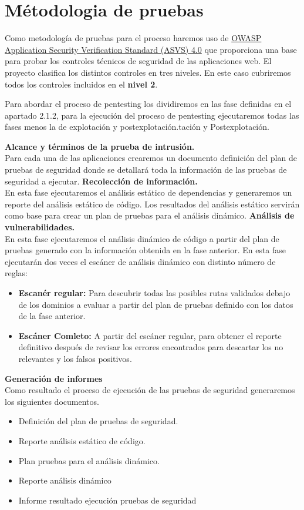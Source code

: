 
\section{Métodologia de pruebas} 

Como metodología de pruebas para el proceso haremos uso 
de \href{https://owasp.org/www-pdf-archive/OWASP_Application_Security_Verification_Standard_4.0-en.pdf}{OWASP Application Security Verification Standard (ASVS) 4.0} 
que proporciona una base para probar los controles técnicos de seguridad de las aplicaciones web. El proyecto clasifica
 los distintos controles en tres niveles. En este caso cubriremos todos los controles incluidos en el \textbf{nivel 2}.

 Para abordar el proceso de pentesting los dividiremos en las fase definidas en el 
 apartado 2.1.2, para la ejecución del proceso de pentesting ejecutaremos todas las fases menos la 
 de explotación y postexplotación.tación y Postexplotación.

\textbf{Alcance y términos de la prueba de intrusión.}\\
 Para cada una de las aplicaciones crearemos un documento definición del plan de pruebas de seguridad donde se
detallará toda la información de las pruebas de seguridad a ejecutar.
\textbf{Recolección de información.}\\
En esta fase ejecutaremos el análisis estático de dependencias y generaremos un reporte del análisis estático de código. Los resultados del 
análisis estático servirán como base para crear un plan de pruebas para el análisis dinámico.
\textbf{Análisis de vulnerabilidades.}\\
En esta fase ejecutaremos el análisis dinámico de código a partir del plan de pruebas generado con la información obtenida en la fase anterior.
En esta fase ejecutarán dos veces el escáner de análisis dinámico con distinto número de reglas:
\begin{itemize}
    \item \textbf{Escanér regular:} Para descubrir todas las posibles rutas validados debajo de los dominios 
    a evaluar a partir del plan de pruebas definido con los datos de la fase anterior.
    \item \textbf{Escáner Comleto:} A partir del escáner regular, para obtener el reporte definitivo después 
    de revisar los errores encontrados para descartar los no relevantes y los falsos positivos.
\end{itemize}
\textbf{Generación de informes}\\
Como resultado el proceso de ejecución de las pruebas de seguridad generaremos los siguientes documentos.
\begin{itemize}
    \item Definición del plan de pruebas de seguridad.
    \item Reporte análisis estático de código.
    \item Plan pruebas para el análisis dinámico.
    \item Reporte análisis dinámico
    \item Informe resultado ejecución pruebas de seguridad
\end{itemize}


